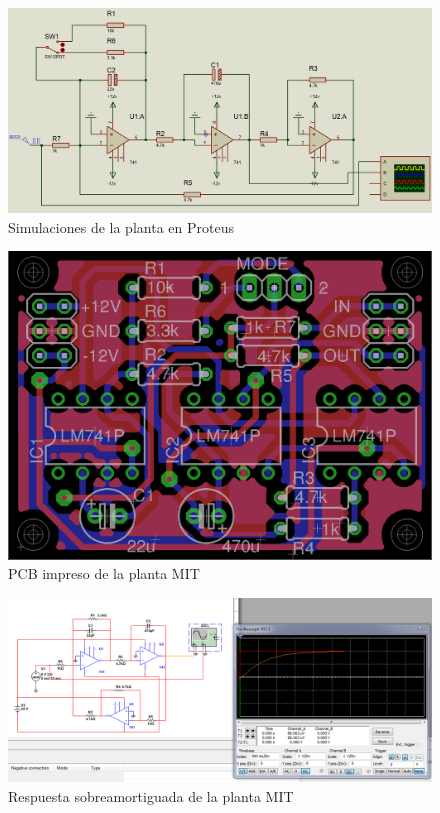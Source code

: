 \begin{figure}[h!]
  \centering
  \includegraphics[scale=0.35]{images/activities/plantas_analogicas/proteus-mit.png}
  \caption{Simulaciones de la planta en Proteus}
  \label{fig:proteus-mit}
\end{figure}

\begin{figure}[h!]
  \centering
  \includegraphics[scale=0.25]{images/activities/plantas_analogicas/board-planta-mit.png}
  \caption{PCB impreso de la planta MIT}
  \label{fig:board-planta-mit}
\end{figure}

\begin{figure}[h!]
  \centering
  \includegraphics[scale=0.3]{images/activities/plantas_analogicas/mit-sobre.png}
  \caption{Respuesta sobreamortiguada de la planta MIT}
  \label{fig:mit-sobre}
\end{figure}

